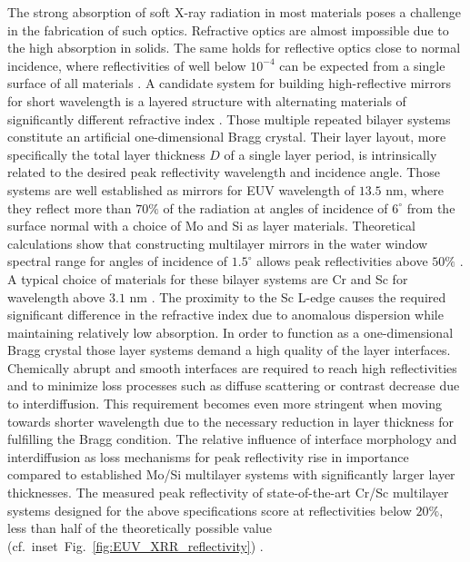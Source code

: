 The strong absorption of soft X-ray radiation in most materials poses a challenge in the fabrication of such optics. Refractive optics are almost impossible due to the high absorption in solids. The same holds for reflective optics close to normal incidence, where reflectivities of well below $10^{-4}$ can be expected from a single surface of all materials \cite{henke}. A candidate system for building high-reflective mirrors for short wavelength is a layered structure with alternating materials of significantly different refractive index \cite{SpillerMultilayer}. Those multiple repeated bilayer systems constitute an artificial one-dimensional Bragg crystal. Their layer layout, more specifically the total layer thickness $D$ of a single layer period, is intrinsically related to the desired peak reflectivity wavelength and incidence angle. Those systems are well established as mirrors for EUV wavelength of $13.5$ nm, where they reflect more than $70\%$ of the radiation at angles of incidence of $6^\circ$ from 
the surface normal with a choice of Mo and Si as layer materials. Theoretical calculations show that constructing multilayer mirrors in the water window spectral range for angles of incidence of $1.5^\circ$ allows peak reflectivities above $50\%$ \cite{Schafers:98}. A typical choice of materials for these bilayer systems are Cr and Sc for wavelength above $3.1$ nm \cite{Salashchenko19977, Schafers:98}. The proximity to the Sc L-edge causes the required significant difference in the refractive index due to anomalous dispersion while maintaining relatively low absorption. In order to function as a one-dimensional Bragg crystal those layer systems demand a high quality of the layer interfaces. Chemically abrupt and smooth interfaces are required to reach high reflectivities and to minimize loss processes such as diffuse scattering or contrast decrease due to interdiffusion. This requirement becomes even more stringent when moving towards shorter wavelength due to the necessary reduction in layer thickness for 
fulfilling the Bragg condition.
The relative influence of interface morphology and interdiffusion as loss mechanisms for peak reflectivity rise in importance compared to established Mo/Si multilayer systems with significantly larger layer thicknesses. The measured peak reflectivity of state-of-the-art Cr/Sc multilayer systems designed for the above specifications score at reflectivities below $20\%$, less than half of the theoretically possible value (cf.~inset~Fig.~\ref{fig:EUV_XRR_reflectivity}) \cite{Eriksson:03, doi:10.1117/12.505688}.

